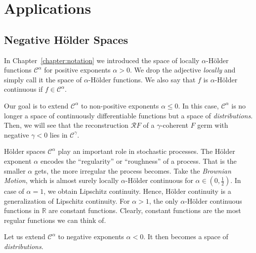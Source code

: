 \chapter{Applications}

\section{Negative Hölder Spaces}

In Chapter~\ref{chapter:notation} we introduced the space of locally \( \alpha  \)-Hölder functions \( \mathcal{C}^\alpha \) for positive exponents \( \alpha > 0 \). We drop the adjective \emph{locally} and simply call it the space of \( \alpha \)-Hölder functions. We also say that \( f \) is \( \alpha \)-Hölder continuous if \( f \in \mathcal{C}^\alpha \). 

Our goal is to extend \( \mathcal{C}^\alpha \) to non-positive exponents \( \alpha \leq 0 \). In this case, \( \mathcal{C}^\alpha \) is no longer a space of continuously differentiable functions but a space of \emph{distributions}. Then, we will see that the reconstruction \( \mathcal{R}F \) of a \( \gamma \)-coherent \( F \) germ with negative \( \gamma < 0\) lies in \( \mathcal{C}^\gamma \).

Hölder spaces \( \mathcal{C}^\alpha \) play an important role in stochastic processes. The Hölder exponent \( \alpha \) encodes the ``regularity'' or ``roughness'' of a process. That is the smaller \( \alpha \) gets, the more irregular the process becomes. Take the \emph{Brownian Motion}, which is almost surely locally \( \alpha \)-Hölder continuous for \( \alpha \in (0, \frac{1}{2}) \). In case of \( \alpha = 1 \), we obtain Lipschitz continuity. Hence, Hölder continuity is a generalization of Lipschitz continuity. For \( \alpha > 1 \), the only \( \alpha \)-Hölder continuous functions in \( \mathbb{R} \) are constant functions. Clearly, constant functions are the most regular functions we can think of. 

Let us extend \( \mathcal{C}^\alpha \) to negative exponents \( \alpha < 0 \). It then becomes a space of \emph{distributions}.

